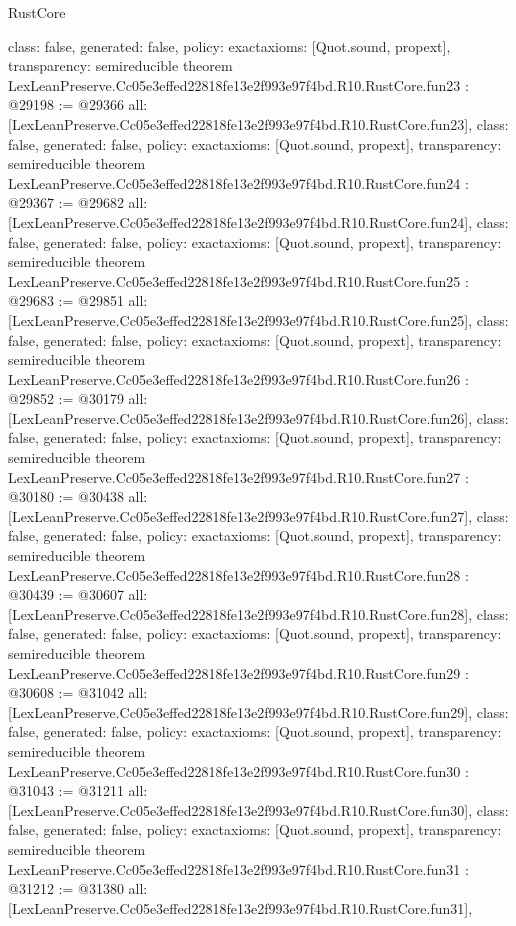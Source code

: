\begin{lexlean}{RustCore}
\begin{coremodule}
{  class: false,
  generated: false,
  policy: exact{axioms: [Quot.sound, propext]},
  transparency: semireducible
}
theorem LexLeanPreserve.Cc05e3effed22818fe13e2f993e97f4bd.R10.RustCore.fun23 : @29198 := @29366 {
  all: [LexLeanPreserve.Cc05e3effed22818fe13e2f993e97f4bd.R10.RustCore.fun23],
  class: false,
  generated: false,
  policy: exact{axioms: [Quot.sound, propext]},
  transparency: semireducible
}
theorem LexLeanPreserve.Cc05e3effed22818fe13e2f993e97f4bd.R10.RustCore.fun24 : @29367 := @29682 {
  all: [LexLeanPreserve.Cc05e3effed22818fe13e2f993e97f4bd.R10.RustCore.fun24],
  class: false,
  generated: false,
  policy: exact{axioms: [Quot.sound, propext]},
  transparency: semireducible
}
theorem LexLeanPreserve.Cc05e3effed22818fe13e2f993e97f4bd.R10.RustCore.fun25 : @29683 := @29851 {
  all: [LexLeanPreserve.Cc05e3effed22818fe13e2f993e97f4bd.R10.RustCore.fun25],
  class: false,
  generated: false,
  policy: exact{axioms: [Quot.sound, propext]},
  transparency: semireducible
}
theorem LexLeanPreserve.Cc05e3effed22818fe13e2f993e97f4bd.R10.RustCore.fun26 : @29852 := @30179 {
  all: [LexLeanPreserve.Cc05e3effed22818fe13e2f993e97f4bd.R10.RustCore.fun26],
  class: false,
  generated: false,
  policy: exact{axioms: [Quot.sound, propext]},
  transparency: semireducible
}
theorem LexLeanPreserve.Cc05e3effed22818fe13e2f993e97f4bd.R10.RustCore.fun27 : @30180 := @30438 {
  all: [LexLeanPreserve.Cc05e3effed22818fe13e2f993e97f4bd.R10.RustCore.fun27],
  class: false,
  generated: false,
  policy: exact{axioms: [Quot.sound, propext]},
  transparency: semireducible
}
theorem LexLeanPreserve.Cc05e3effed22818fe13e2f993e97f4bd.R10.RustCore.fun28 : @30439 := @30607 {
  all: [LexLeanPreserve.Cc05e3effed22818fe13e2f993e97f4bd.R10.RustCore.fun28],
  class: false,
  generated: false,
  policy: exact{axioms: [Quot.sound, propext]},
  transparency: semireducible
}
theorem LexLeanPreserve.Cc05e3effed22818fe13e2f993e97f4bd.R10.RustCore.fun29 : @30608 := @31042 {
  all: [LexLeanPreserve.Cc05e3effed22818fe13e2f993e97f4bd.R10.RustCore.fun29],
  class: false,
  generated: false,
  policy: exact{axioms: [Quot.sound, propext]},
  transparency: semireducible
}
theorem LexLeanPreserve.Cc05e3effed22818fe13e2f993e97f4bd.R10.RustCore.fun30 : @31043 := @31211 {
  all: [LexLeanPreserve.Cc05e3effed22818fe13e2f993e97f4bd.R10.RustCore.fun30],
  class: false,
  generated: false,
  policy: exact{axioms: [Quot.sound, propext]},
  transparency: semireducible
}
theorem LexLeanPreserve.Cc05e3effed22818fe13e2f993e97f4bd.R10.RustCore.fun31 : @31212 := @31380 {
  all: [LexLeanPreserve.Cc05e3effed22818fe13e2f993e97f4bd.R10.RustCore.fun31],
}
\end{coremodule}
\end{lexlean}
